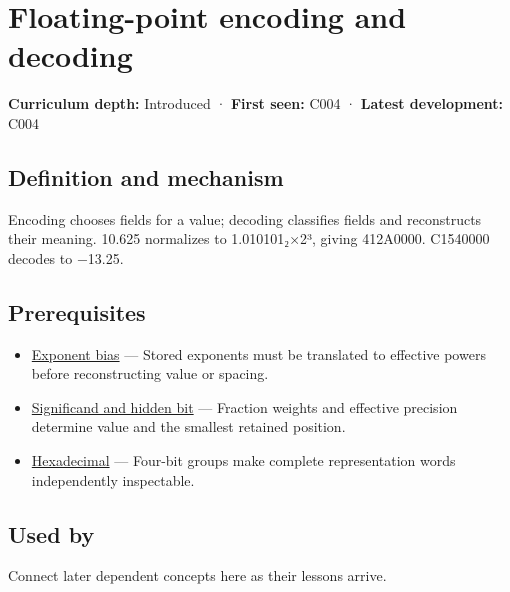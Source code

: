 \hypertarget{appendix-6854d0e2218e}{}\label{referencestart:appendix-6854d0e2218e}
\section{Floating-point encoding and decoding}\label{appendix-6854d0e2218e-floating-point-encoding-and-decoding}

\textbf{Curriculum depth:} Introduced · \textbf{First seen:} C004 · \textbf{Latest development:} C004

\begin{allmightroledefinition}

\subsection{Definition and mechanism}\label{appendix-6854d0e2218e-definition-and-mechanism}

Encoding chooses fields for a value; decoding classifies fields and reconstructs their meaning. 10.625 normalizes to 1.010101₂×2³, giving 412A0000. C1540000 decodes to −13.25.

\end{allmightroledefinition}

\subsection{Prerequisites}\label{appendix-6854d0e2218e-prerequisites}

\begin{itemize}
\tightlist
\item
  \hyperref[appendix-2fae058c82e1]{Exponent bias} --- Stored exponents must be translated to effective powers before reconstructing value or spacing.
\item
  \hyperref[appendix-a24fd710cf67]{Significand and hidden bit} --- Fraction weights and effective precision determine value and the smallest retained position.
\item
  \hyperref[appendix-6b8075763724]{Hexadecimal} --- Four-bit groups make complete representation words independently inspectable.
\end{itemize}

\subsection{Used by}\label{appendix-6854d0e2218e-used-by}

Connect later dependent concepts here as their lessons arrive.

